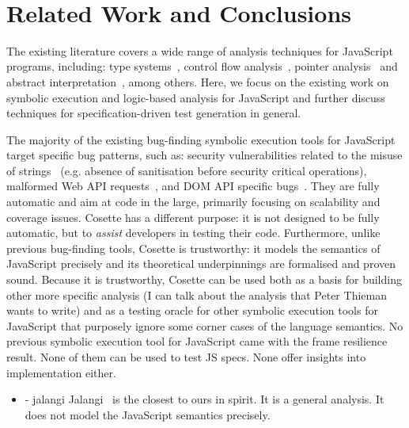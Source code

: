 \documentclass[sigconf, review]{acmart}
\newcommand{\polish}[1]{{\color{red}#1}}
\newcommand{\cosette}{Cosette\xspace}
\newcommand{\myparagraph}[1]{\smallskip\noindent {\bf #1.}\hspace{1pt}}
\begin{document}
\newpage\ \newpage
\section{Related Work and Conclusions}
\label{sec:rwc} 

The existing literature covers a wide range of analysis techniques for JavaScript programs, including: 
type systems~\cite{thiemann:esop:2005,anderson:ecoop:2005,jensen:sas:2009,typescript:toot:2014,feldthaus:oopsla:2014,bierman:ecoop:2014,rastogi:popl:2015},
control flow analysis~\cite{feldthaus2013efficient}, pointer analysis~\cite{jang2009points,sridharan:ecoop:12} and abstract
interpretation~\cite{kashyap:fse:14,jensen:sas:2009,andreasen:oopsla:2014,park:ecoop:15}, among others. 
Here, we focus on the existing work on symbolic execution and  
logic-based analysis for JavaScript and further discuss techniques for specification-driven 
test generation in general.  

\myparagraph{Symbolic Execution for JS}
The majority of the existing bug-finding symbolic execution tools for JavaScript target specific bug patterns, 
such as: security vulnerabilities related to the misuse of strings~\cite{saxena:sp:2010} 
(e.g. absence of sanitisation before security critical operations), malformed Web API requests~\cite{wittern:icse:2018}, and
DOM API specific bugs~\cite{li:fse:2014}. They are fully automatic and aim at code in 
the large, primarily focusing on scalability and coverage issues. \cosette has a different 
purpose: it is not designed to be fully automatic, but to \emph{assist} developers in 
testing their code. 
Furthermore, unlike previous bug-finding tools, \cosette is trustworthy: it models the semantics of 
JavaScript precisely and its theoretical underpinnings are formalised and proven sound. 
Because it is trustworthy, \cosette can be used both as a basis for building other more specific analysis 
\polish{(I can talk about the analysis that Peter Thieman wants to write)} and 
as a testing oracle for other symbolic execution tools for JavaScript that purposely 
ignore some corner cases of the language semantics. 
\polish{No previous symbolic execution tool for JavaScript came with the frame resilience result. 
None of them can be used to test JS specs. None offer insights into implementation either.}


\begin{itemize}
   \item \polish{\cite{koushik:fse:2015} - jalangi} Jalangi~\cite{koushik:fse:2015} is the closest 
            to ours in spirit. It is a general analysis. It does not model the JavaScript semantics 
            precisely. 
\end{itemize}
\end{document}
